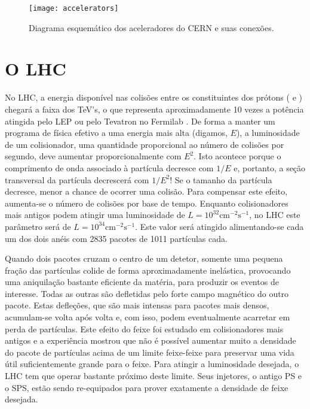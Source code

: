 \begin{figure}
\begin{center}
\texttt{[image: accelerators]}
\end{center}
\caption{Diagrama esquemático dos aceleradores do CERN e suas conexões.}
\label{fig:accel}
\end{figure}

\section{O LHC}

No LHC, a energia disponível nas colisões entre os constituintes dos prótons
( e ) chegará a faixa dos TeV's, o que
representa aproximadamente 10 vezes a potência atingida pelo LEP ou pelo
Tevatron no Fermilab \cite{lhc}. De forma a manter um programa de física
efetivo a uma energia mais alta (digamos, $E$), a luminosidade de um
colisionador, uma quantidade proporcional ao número de colisões por segundo,
deve aumentar proporcionalmente com $E^2$. Isto acontece porque o comprimento
de onda associado à partícula decresce com $1/E$ e, portanto, a seção
transversal da partícula decrescerá com $1/E^2$! Se o tamanho da partícula
decresce, menor a chance de ocorrer uma colisão. Para compensar este efeito,
aumenta-se o número de colisões por base de tempo. Enquanto colisionadores
mais antigos podem atingir uma luminosidade de $L = 10^{32}
\text{cm}^{-2}\text{s}^{-1}$, no LHC este parâmetro será de $L = 10^{34}
\text{cm}^{-2}\text{s}^{-1}$. Este valor será atingido alimentando-se cada um dos
dois anéis com 2835 pacotes de 1011 partículas cada.

Quando dois pacotes cruzam o centro de um detetor, somente uma pequena fração
das partículas colide de forma aproximadamente inelástica, provocando uma
aniquilação bastante eficiente da matéria, para produzir os eventos de
interesse. Todas as outras são defletidas pelo forte campo magnético do outro
pacote. Estas defleções, que são mais intensas para pacotes mais densos,
acumulam-se volta após volta e, com isso, podem eventualmente acarretar em
perda de partículas. Este efeito do feixe foi estudado em colisionadores mais
antigos e a experiência mostrou que não é possível aumentar muito a densidade
do pacote de partículas acima de um limite feixe-feixe para preservar uma vida
útil suficientemente grande para o feixe. Para atingir a luminosidade
desejada, o LHC tem que operar bastante próximo deste limite. Seus injetores,
o antigo PS e o SPS, estão sendo re-equipados para prover exatamente a
densidade de feixe desejada.

